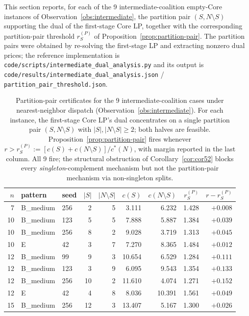 \documentclass[11pt]{article}
\newcommand{\cstar}{c^{\ast}}
\theoremstyle{plain}
\theoremstyle{definition}
\theoremstyle{remark}
\begin{document}
This section reports, for each of the 9 intermediate-coalition empty-Core
instances of Observation~\ref{obs:intermediate}, the partition pair
$(S, N\setminus S)$ supporting the dual of the first-stage Core LP, together
with the corresponding partition-pair threshold $r^{(P)}_{S}$ of
Proposition~\ref{prop:partition-pair}. The partition pairs were obtained by
re-solving the first-stage LP and extracting nonzero dual prices; the
reference implementation is
\verb|code/scripts/intermediate_dual_analysis.py| and its output is
\verb|code/results/intermediate_dual_analysis.json| /
\verb|partition_pair_threshold.json|.

\begin{table}[htbp]
\centering
\footnotesize
\caption{Partition-pair certificates for the 9 intermediate-coalition cases under nearest-neighbor dispatch (Observation~\ref{obs:intermediate}). For each instance, the first-stage Core LP's dual concentrates on a single partition pair $(S,N\setminus S)$ with $|S|,|N\setminus S|\ge 2$; both halves are feasible. Proposition~\ref{prop:partition-pair} fires whenever $r > r^{(P)}_{S} := [c(S)+c(N\setminus S)]/\cstar(N)$, with margin reported in the last column. All 9 fire; the structural obstruction of Corollary~\ref{cor:cor52} blocks every \emph{singleton}-complement mechanism but not the partition-pair mechanism via non-singleton splits.}
\label{tab:partition-pair}
\begin{tabular}{@{}rllrrrrrr@{}}
\toprule
$n$ & pattern & seed & $|S|$ & $|N\setminus S|$ & $c(S)$ & $c(N\setminus S)$ & $r^{(P)}_{S}$ & $r-r^{(P)}_{S}$ \\
\midrule
 7 & B\_medium & 256 & 2 &  5 &  3.111 &  6.232 & 1.428 & $+0.008$ \\
10 & B\_medium & 123 & 5 &  5 &  7.888 &  5.887 & 1.384 & $+0.039$ \\
10 & B\_medium & 256 & 8 &  2 &  9.028 &  3.719 & 1.313 & $+0.045$ \\
10 & E         &  42 & 3 &  7 &  7.270 &  8.365 & 1.484 & $+0.012$ \\
12 & B\_medium &  99 & 9 &  3 & 10.654 &  6.529 & 1.284 & $+0.111$ \\
12 & B\_medium & 123 & 3 &  9 &  6.095 &  9.543 & 1.354 & $+0.133$ \\
12 & B\_medium & 256 &10 &  2 & 11.610 &  4.074 & 1.271 & $+0.152$ \\
12 & E         &  42 & 4 &  8 &  8.036 & 10.391 & 1.561 & $+0.049$ \\
15 & B\_medium & 256 &12 &  3 & 13.407 &  5.167 & 1.300 & $+0.026$ \\
\bottomrule
\end{tabular}
\end{table}
\end{document}
